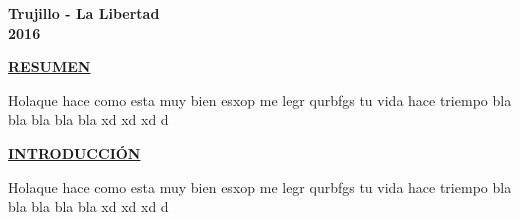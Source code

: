 \documentclass[a4paper, 12pt]{report}
\begin{document}
\vskip 3cm
\begin{center}    
	{\bf {\fontsize{14}{16.8}\selectfont Trujillo - La Libertad
	\\ 2016 }}
\end{center} 
\newpage
\pagestyle{plain}
\doublespacing
{}
\vspace*{6em}
\begin{center}
{\bf{\large{\underline{RESUMEN}}}}
\end{center}
\begin{justify}
Holaque hace como esta muy bien esxop me legr qurbfgs tu vida hace triempo bla bla bla bla bla xd xd xd d
\end{justify}
\newpage



\vspace*{6em}
\begin{center}
{\bf{\large{\underline{INTRODUCCI\'ON}}}}
\end{center}
\begin{justify}
Holaque hace como esta muy bien esxop me legr qurbfgs tu vida hace triempo bla bla bla bla bla xd xd xd d
\end{justify}
\newpage



\renewcommand{\contentsname}{\centering\bf{\large{\underline{\'INDICE}}}}
\renewcommand{\listfigurename}{\centering\bf{\large{\underline{LISTA DE TABLAS}}}}
\renewcommand{\listtablename}{\centering\bf{\large{\underline{LISTA DE FIGURAS}}}}
\tableofcontents    %
\listoffigures      %
\listoftables       %
\newpage



\end{document}
